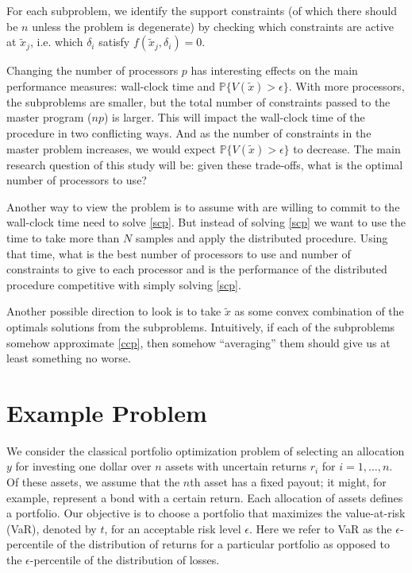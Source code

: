 \documentclass[12pt]{article}
\begin{document}
For each subproblem, we identify the support constraints (of which there should be $n$ unless the problem is degenerate) by checking which constraints are active at $\tilde{x}_j$, i.e. which $\delta_i$ satisfy $f(\tilde{x}_j, \delta_i) = 0$.

Changing the number of processors $p$ has interesting effects on the main performance measures: wall-clock time and $\mathbb{P}\{V(\tilde{x}) > \epsilon\}$.
With more processors, the subproblems are smaller, but the total number of constraints passed to the master program ($np$) is larger.
This will impact the wall-clock time of the procedure in two conflicting ways.
And as the number of constraints in the master problem increases, we would expect $\mathbb{P}\{V(\tilde{x}) > \epsilon\}$ to decrease.
The main research question of this study will be: given these trade-offs, what is the optimal number of processors to use?

Another way to view the problem is to assume with are willing to commit to the wall-clock time need to solve \ref{scp}.
But instead of solving \ref{scp} we want to use the time to take more than $N$ samples and apply the distributed procedure.
Using that time, what is the best number of processors to use and number of constraints to give to each processor and is the performance of the distributed procedure competitive with simply solving \ref{scp}.

Another possible direction to look is to take $\tilde{x}$ as some convex combination of the
optimals solutions from the subproblems.  Intuitively, if each of the subproblems somehow
approximate \ref{ccp}, then somehow ``averaging'' them should give us at least something
no worse.

\section*{Example Problem}

We consider the classical portfolio optimization problem of selecting an allocation $y$ for investing one dollar over $n$ assets with uncertain returns $r_i$ for $i = 1, \ldots, n$.
Of these assets, we assume that the $n$th asset has a fixed payout; it might, for example, represent a bond with a certain return.
Each allocation of assets defines a portfolio.
Our objective is to choose a portfolio that maximizes the value-at-risk (VaR), denoted by $t$, for an acceptable risk level $\epsilon$.
Here we refer to VaR as the $\epsilon$-percentile of the distribution of returns for a particular portfolio as opposed to the $\epsilon$-percentile of the distribution of losses.
\end{document}
